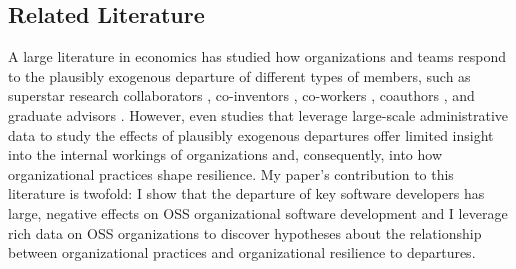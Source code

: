 \documentclass[12pt,notitlepage]{article}
\begin{document}
\subsection*{Related Literature} \label{sec:literature}



A large literature in economics has studied how organizations and teams respond to the plausibly exogenous departure of different types of members, such as superstar research collaborators \citep{azoulay_superstar_2010, azoulay_does_2019}, co-inventors \citep{jaravel_team-specific_2018}, co-workers \citep{jager_how_2024}, coauthors \citep{oettl_reconceptualizing_2012, khanna_aftermath_2021}, and graduate advisors \citep{waldinger_quality_2010}. 
However, even studies that leverage large-scale administrative data to study the effects of plausibly exogenous departures \citep{jaravel_team-specific_2018, jager_how_2024} offer limited insight into the internal workings of organizations and, consequently, into how organizational practices shape resilience.
My paper's contribution to this literature is twofold: I show that the departure of key software developers has large, negative effects on OSS organizational software development and I leverage rich data on OSS organizations to discover hypotheses about the relationship between organizational practices and organizational resilience to departures.
\end{document}
